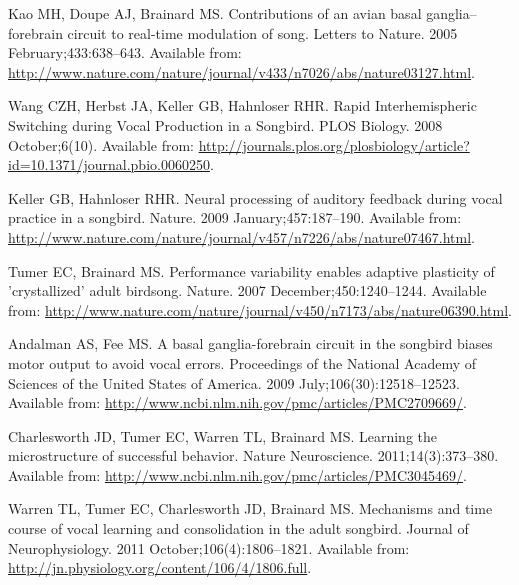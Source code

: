\documentclass[10pt,letterpaper]{article}
\begin{document}
%
\begin{thebibliography}{10}

Kao MH, Doupe AJ, Brainard MS.
\newblock Contributions of an avian basal ganglia--forebrain circuit to
  real-time modulation of song.
\newblock Letters to Nature. 2005 February;433:638--643.
\newblock Available from:
  \url{http://www.nature.com/nature/journal/v433/n7026/abs/nature03127.html}.

Wang CZH, Herbst JA, Keller GB, Hahnloser RHR.
\newblock Rapid Interhemispheric Switching during Vocal Production in a
  Songbird.
\newblock PLOS Biology. 2008 October;6(10).
\newblock Available from:
  \url{http://journals.plos.org/plosbiology/article?id=10.1371/journal.pbio.0060250}.

Keller GB, Hahnloser RHR.
\newblock Neural processing of auditory feedback during vocal practice in a
  songbird.
\newblock Nature. 2009 January;457:187--190.
\newblock Available from:
  \url{http://www.nature.com/nature/journal/v457/n7226/abs/nature07467.html}.

Tumer EC, Brainard MS.
\newblock Performance variability enables adaptive plasticity of 'crystallized'
  adult birdsong.
\newblock Nature. 2007 December;450:1240--1244.
\newblock Available from:
  \url{http://www.nature.com/nature/journal/v450/n7173/abs/nature06390.html}.

Andalman AS, Fee MS.
\newblock A basal ganglia-forebrain circuit in the songbird biases motor output
  to avoid vocal errors.
\newblock Proceedings of the National Academy of Sciences of the United States
  of America. 2009 July;106(30):12518--12523.
\newblock Available from:
  \url{http://www.ncbi.nlm.nih.gov/pmc/articles/PMC2709669/}.

Charlesworth JD, Tumer EC, Warren TL, Brainard MS.
\newblock Learning the microstructure of successful behavior.
\newblock Nature Neuroscience. 2011;14(3):373--380.
\newblock Available from:
  \url{http://www.ncbi.nlm.nih.gov/pmc/articles/PMC3045469/}.

Warren TL, Tumer EC, Charlesworth JD, Brainard MS.
\newblock Mechanisms and time course of vocal learning and consolidation in the
  adult songbird.
\newblock Journal of Neurophysiology. 2011 October;106(4):1806--1821.
\newblock Available from:
  \url{http://jn.physiology.org/content/106/4/1806.full}.


\end{thebibliography}
\end{document}
